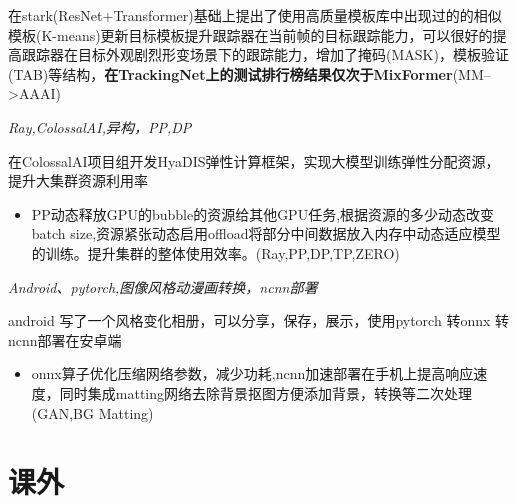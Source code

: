 \documentclass{uniquecv}
\begin{document}
在stark(ResNet+Transformer)基础上提出了使用高质量模板库中出现过的的相似模板(K-means)更新目标模板提升跟踪器在当前帧的目标跟踪能力，可以很好的提高跟踪器在目标外观剧烈形变场景下的跟踪能力，增加了掩码(MASK)，模板验证(TAB)等结构，\textbf{在TrackingNet上的测试排行榜结果仅次于MixFormer}(MM-->AAAI)

\textit{Ray,ColossalAI,异构，PP,DP}
\vspace{0.4ex}

在ColossalAI项目组开发HyaDIS弹性计算框架，实现大模型训练弹性分配资源，提升大集群资源利用率
\begin{itemize}
  \item PP动态释放GPU的bubble的资源给其他GPU任务,根据资源的多少动态改变batch size,资源紧张动态启用offload将部分中间数据放入内存中动态适应模型的训练。提升集群的整体使用效率。(Ray,PP,DP,TP,ZERO)
\end{itemize}
\textit{Android、pytorch,图像风格动漫画转换，ncnn部署}
\vspace{0.4ex}

android 写了一个风格变化相册，可以分享，保存，展示，使用pytorch 转onnx 转 ncnn部署在安卓端
\begin{itemize}
  \item onnx算子优化压缩网络参数，减少功耗,ncnn加速部署在手机上提高响应速度，同时集成matting网络去除背景抠图方便添加背景，转换等二次处理(GAN,BG Matting)
\end{itemize}
\section{课外}
\end{document}
